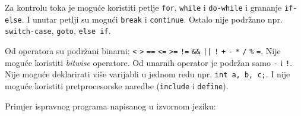 Za kontrolu toka je moguće koristiti petlje \texttt{for}, \texttt{while} i \texttt{do-while} i grananje \texttt{if-else}. 
I unutar petlji su mogući \texttt{break} i \texttt{continue}.
Ostalo nije podržano npr. \texttt{switch-case}, \texttt{goto}, \texttt{else if}.

Od operatora su podržani binarni: \texttt{<}  \texttt{>}  \texttt{==}  \texttt{<=}  \texttt{>=}  \texttt{!=}  \texttt{\&\&}  \texttt{||}  \texttt{!}  \texttt{+}  \texttt{-}  \texttt{*}  \texttt{/}  \texttt{\%}  \texttt{=}. Nije moguće koristiti \emph{bitwise} operatore. Od unarnih operator je podržan samo \texttt{-} i \texttt{!}. Nije moguće deklarirati više varijabli u jednom redu npr.
\texttt{int a, b, c;}. I nije moguće koristiti pretprocesorske naredbe (\texttt{include} i \texttt{define}).

Primjer ispravnog programa napisanog u izvornom jeziku:


